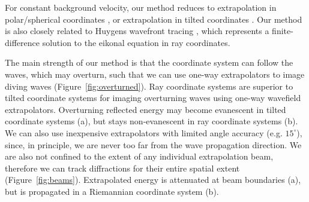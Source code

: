 For constant background velocity,
our method reduces to 
extrapolation in polar/spherical coordinates
\cite[]{Nichols.sepphd.81,GEO61-01-02530263},
or extrapolation in tilted coordinates
\cite[]{Etgen-SEG02}.
Our method is also closely related to Huygens wavefront tracing
\cite[]{GEO66-03-08830889}, 
which represents a finite-difference
solution to the eikonal equation in ray coordinates.
\par
The main strength of our method is that the coordinate system
can follow the waves, which may overturn, such that 
we can use one-way extrapolators to image 
diving waves (Figure~\ref{fig:overturned}).
{
Ray coordinate systems are superior to tilted coordinate 
systems for imaging overturning waves using one-way 
wavefield extrapolators.
Overturning reflected energy may become evanescent 
in tilted coordinate systems (a), 
but stays non-evanescent in ray coordinate systems (b).
}
We can also use inexpensive
extrapolators with limited angle accuracy (e.g. $15^\circ$),
since, in principle, we are never too far from the 
wave propagation direction.
We are also not confined to the extent
of any individual extrapolation 
beam, therefore we can track diffractions
for their entire spatial extent (Figure~\ref{fig:beams}).
{Extrapolated energy is attenuated
at beam boundaries (a), but is propagated in a Riemannian 
coordinate system (b).}





















